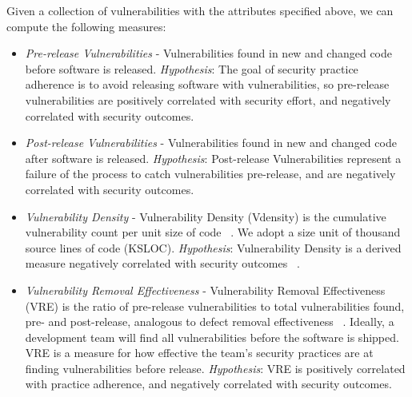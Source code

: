 Given a collection of vulnerabilities with the attributes specified above, we can compute the following measures:
\begin{itemize}
\item \textit{Pre-release Vulnerabilities} - Vulnerabilities found in new and changed code before software is released. \textit{Hypothesis}: The goal of security practice adherence is to avoid releasing software with vulnerabilities, so pre-release vulnerabilities are positively correlated with security effort, and negatively correlated with security outcomes.
\item \textit{Post-release Vulnerabilities} - Vulnerabilities found in new and changed code after software is released. \textit{Hypothesis}: Post-release Vulnerabilities represent a failure of the process to catch vulnerabilities pre-release, and are negatively correlated with security outcomes.
\item \textit{Vulnerability Density} - Vulnerability Density (Vdensity) is the cumulative vulnerability count per unit size of code ~\cite{alhazmi2007assessing}. We adopt a size unit of thousand source lines of code (KSLOC). \textit{Hypothesis}: Vulnerability Density is a derived measure negatively correlated with security outcomes ~\cite{alhazmi2007measuring}.
\item \textit{Vulnerability Removal Effectiveness} - Vulnerability Removal Effectiveness (VRE) is the ratio of pre-release vulnerabilities to total vulnerabilities found, pre- and post-release, analogous to defect removal effectiveness ~\cite{kan2002metrics}. Ideally, a development team will find all vulnerabilities before the software is shipped.  VRE is a measure for how effective the team’s security practices are at finding vulnerabilities before release. \textit{Hypothesis}: VRE is positively correlated with practice adherence, and negatively correlated with security outcomes.
\end{itemize}

